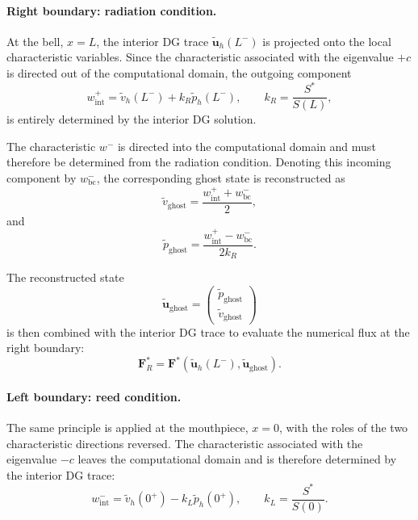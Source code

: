 \documentclass[11pt,a4paper]{report}
\theoremstyle{plain}
\theoremstyle{definition}
\begin{document}
\paragraph{Right boundary: radiation condition.}

At the bell, $x=L$, the interior DG trace
$\tilde{\mathbf u}_h(L^-)$ is projected onto the local characteristic
variables. Since the characteristic associated with the eigenvalue $+c$ is
directed out of the computational domain, the outgoing component
\begin{equation}
w^+_{\mathrm{int}}
=
\tilde v_h(L^-)
+
k_R \tilde p_h(L^-),
\qquad
k_R=\frac{S^\ast}{S(L)},
\end{equation}
is entirely determined by the interior DG solution.

The characteristic $w^-$ is directed into the computational domain and must
therefore be determined from the radiation condition. Denoting this incoming
component by $w^-_{\mathrm{bc}}$, the corresponding ghost state is reconstructed
as
\begin{equation}
\tilde v_{\mathrm{ghost}}
=
\frac{
w^+_{\mathrm{int}}
+
w^-_{\mathrm{bc}}
}{2},
\end{equation}
and
\begin{equation}
\tilde p_{\mathrm{ghost}}
=
\frac{
w^+_{\mathrm{int}}
-
w^-_{\mathrm{bc}}
}{
2k_R
}.
\end{equation}

The reconstructed state
\begin{equation}
\tilde{\mathbf u}_{\mathrm{ghost}}
=
\begin{pmatrix}
\tilde p_{\mathrm{ghost}}\\
\tilde v_{\mathrm{ghost}}
\end{pmatrix}
\end{equation}
is then combined with the interior DG trace to evaluate the numerical flux at
the right boundary:
\begin{equation}
\boxed{
\mathbf F_R^\ast
=
\mathbf F^\ast
\left(
\tilde{\mathbf u}_h(L^-),
\tilde{\mathbf u}_{\mathrm{ghost}}
\right).
}
\end{equation}


\paragraph{Left boundary: reed condition.}

The same principle is applied at the mouthpiece, $x=0$, with the roles of the
two characteristic directions reversed. The characteristic associated with
the eigenvalue $-c$ leaves the computational domain and is therefore determined
by the interior DG trace:
\begin{equation}
w^-_{\mathrm{int}}
=
\tilde v_h(0^+)
-
k_L \tilde p_h(0^+),
\qquad
k_L=\frac{S^\ast}{S(0)}.
\end{equation}
\end{document}
